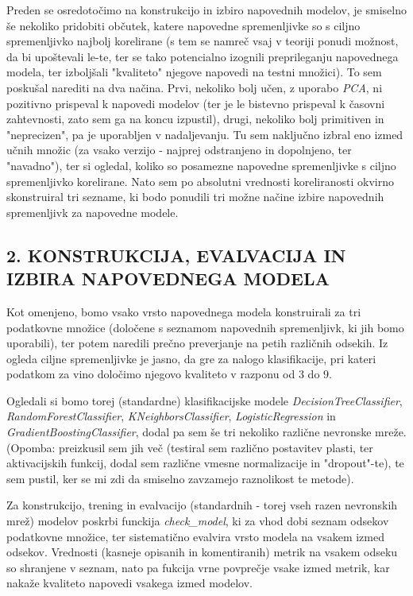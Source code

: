 \documentclass{article}
\begin{document}
Preden se osredotočimo na konstrukcijo in izbiro napovednih modelov, je smiselno še nekoliko pridobiti občutek, katere napovedne spremenljivke so s ciljno spremenljivko najbolj korelirane (s tem se namreč vsaj v teoriji ponudi možnost, da bi upoštevali le-te, ter se tako potencialno izognili preprileganju napovednega modela, ter izboljšali "kvaliteto" njegove napovedi na testni množici).
To sem poskušal narediti na dva načina. Prvi, nekoliko bolj učen, z uporabo \textit{PCA}, ni pozitivno prispeval k napovedi modelov (ter je le bistevno prispeval k časovni zahtevnosti, zato sem ga na koncu izpustil), drugi, nekoliko bolj primitiven in "neprecizen", pa je uporabljen v nadaljevanju. 
Tu sem naključno izbral eno izmed učnih množic (za vsako verzijo - najprej odstranjeno in dopolnjeno, ter "navadno"), ter si ogledal, koliko so posamezne napovedne spremenljivke s ciljno spremenljivko korelirane. 
Nato sem po absolutni vrednosti koreliranosti okvirno skonstruiral tri sezname, ki bodo ponudili tri možne načine izbire napovednih spremenljivk za napovedne modele.

\subsection*{2. KONSTRUKCIJA, EVALVACIJA IN IZBIRA NAPOVEDNEGA MODELA}

Kot omenjeno, bomo vsako vrsto napovednega modela konstruirali za tri podatkovne množice (določene s seznamom napovednih spremenljivk, ki jih bomo uporabili), ter potem naredili prečno preverjanje na petih različnih odsekih. 
Iz ogleda ciljne spremenljivke je jasno, da gre za nalogo klasifikacije, pri kateri podatkom za vino določimo njegovo kvaliteto v razponu od $3$ do $9$.

Ogledali si bomo torej (standardne) klasifikacijske modele \textit{DecisionTreeClassifier}, \textit{RandomForestClassifier}, \textit{KNeighborsClassifier}, \textit{LogisticRegression} in \textit{GradientBoostingClassifier}, dodal pa sem še tri nekoliko različne nevronske mreže. 
(Opomba: preizkusil sem jih več (testiral sem različno postavitev plasti, ter aktivacijskih funkcij, dodal sem različne vmesne normalizacije in "dropout"-te), te sem pustil, ker se mi zdi da smiselno zavzamejo raznolikost te metode). 

Za konstrukcijo, trening in evalvacijo (standardnih - torej vseh razen nevronskih mrež) modelov poskrbi funckija \textit{check\_model}, ki za vhod dobi seznam odsekov podatkovne množice, ter sistematično evalvira vrsto modela na vsakem izmed odsekov. 
Vrednosti (kasneje opisanih in komentiranih) metrik na vsakem odseku so shranjene v seznam, nato pa fukcija vrne povprečje vsake izmed metrik, kar nakaže kvaliteto napovedi vsakega izmed modelov. 
\end{document}
